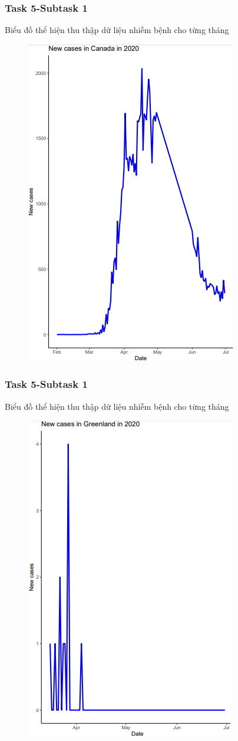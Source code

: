 \documentclass[english,10pt,table]{beamer}
\begin{document}
{
    \frametitle{Task 5-Subtask 1}
    \begin{block}{Biểu đồ thể hiện thu thập dữ liệu nhiễm bệnh cho từng tháng}
    \begin{figure}[H]
		\centering
	    \includegraphics[scale=0.5]{images/5.1.png}
	\end{figure}
    \end{block}
}
\frame
{
    \frametitle{Task 5-Subtask 1}
    \begin{block}{Biểu đồ thể hiện thu thập dữ liệu nhiễm bệnh cho từng tháng}
    \begin{figure}[H]
		\centering
	    \includegraphics[scale=0.5]{images/5.1.1.png}
	\end{figure}
    \end{block}
}
\end{document}
